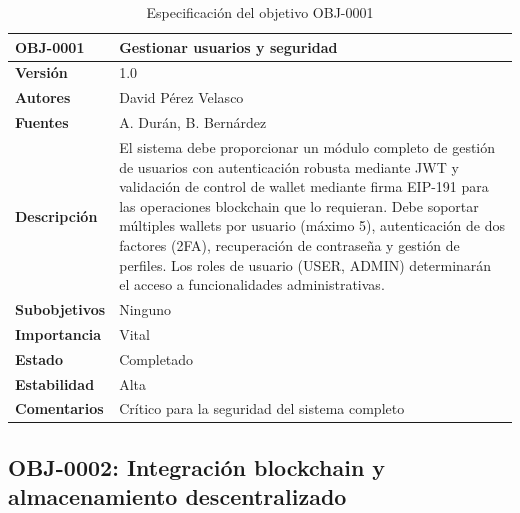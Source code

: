 \documentclass[11pt, a4paper]{article}
\begin{document}
\begin{table}[H]
    \centering
    \small
    \begin{tabular}{|p{4cm}|p{10cm}|}
    \hline
    \textbf{OBJ-0001} & Gestionar usuarios y seguridad \\
    \hline
    \textbf{Versión} & 1.0 \\
    \hline
    \textbf{Autores} & David Pérez Velasco \\
    \hline
    \textbf{Fuentes} & A. Durán, B. Bernárdez \\
    \hline
    \textbf{Descripción} & El sistema debe proporcionar un módulo completo de gestión de usuarios con autenticación robusta mediante JWT y validación de control de wallet mediante firma EIP-191 para las operaciones blockchain que lo requieran. Debe soportar múltiples wallets por usuario (máximo 5), autenticación de dos factores (2FA), recuperación de contraseña y gestión de perfiles. Los roles de usuario (USER, ADMIN) determinarán el acceso a funcionalidades administrativas. \\
    \hline
    \textbf{Subobjetivos} & Ninguno \\
    \hline
    \textbf{Importancia} & Vital \\
    \hline
    \textbf{Estado} & Completado \\
    \hline
    \textbf{Estabilidad} & Alta \\
    \hline
    \textbf{Comentarios} & Crítico para la seguridad del sistema completo \\
    \hline
    \end{tabular}
    \caption{Especificación del objetivo OBJ-0001}
\end{table}

\subsection{OBJ-0002: Integración blockchain y almacenamiento descentralizado}
\end{document}
